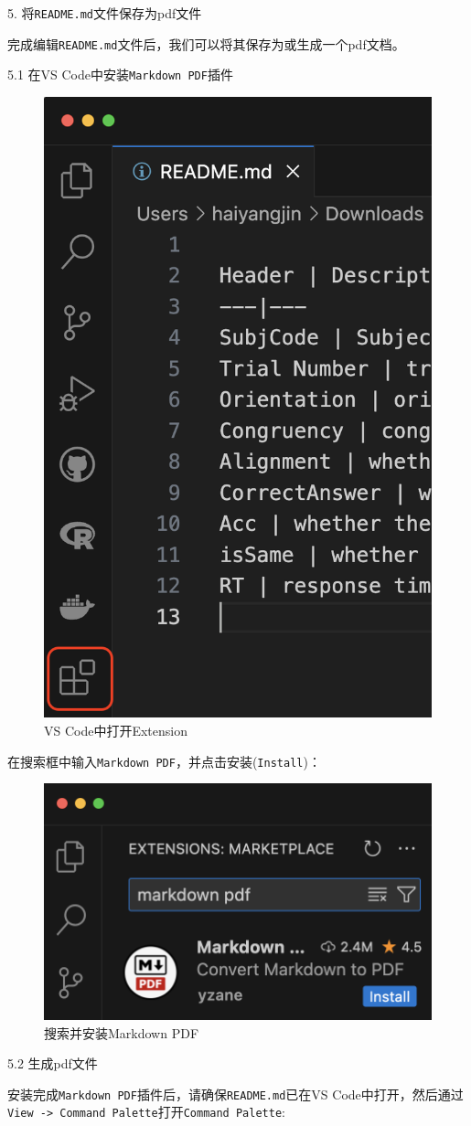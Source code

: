 \documentclass[]{ctexbook}
\theoremstyle{definition}
\theoremstyle{definition}
\theoremstyle{definition}
\theoremstyle{definition}
\theoremstyle{remark}
\begin{document}
5. 将\texttt{README.md}文件保存为pdf文件

完成编辑\texttt{README.md}文件后，我们可以将其保存为或生成一个pdf文档。

5.1 在VS Code中安装\texttt{Markdown\ PDF}插件

\begin{figure}

{\centering \includegraphics[width=0.4\linewidth]{img/vscode/mkreadme_extension} 

}

\caption{VS Code中打开Extension}\label{fig:mkreadme-extension}
\end{figure}

在搜索框中输入\texttt{Markdown\ PDF}，并点击安装(\texttt{Install})：

\begin{figure}

{\centering \includegraphics[width=0.5\linewidth]{img/vscode/mkreadme_markdownpdf} 

}

\caption{搜索并安装Markdown PDF}\label{fig:mkreadme-markdownpdf}
\end{figure}

5.2 生成pdf文件

安装完成\texttt{Markdown\ PDF}插件后，请确保\texttt{README.md}已在VS Code中打开，然后通过\texttt{View\ -\textgreater{}\ Command\ Palette}打开\texttt{Command\ Palette}:
\end{document}
